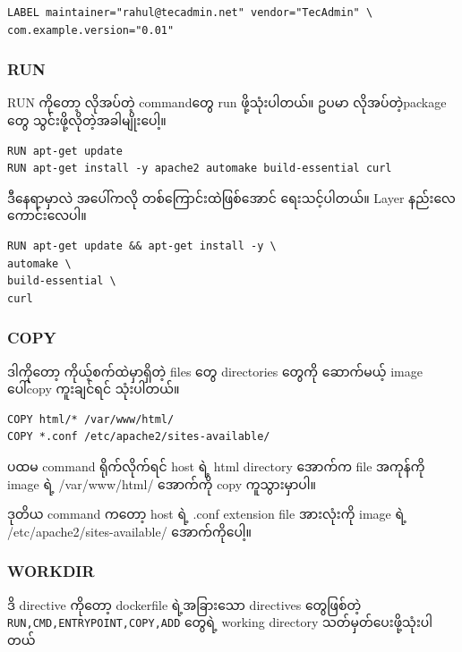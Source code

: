 \documentclass{article}
\begin{document}
\begin{verbatim}
LABEL maintainer="rahul@tecadmin.net" vendor="TecAdmin" \
com.example.version="0.01"
\end{verbatim}

\subsubsection{RUN}\label{run}

RUN ကို​တော့ လိုအပ်​တဲ့ command​တွေ run ဖို့သုံးပါတယ်။ ဥပမာ
လိုအပ်တဲ့​package​တွေ သွင်းဖို့လိုတဲ့အခါမျိုး​ပေါ့။

\begin{verbatim}
RUN apt-get update 
RUN apt-get install -y apache2 automake build-essential curl ​​
\end{verbatim}

ဒီ​နေရာမှာလဲ အ​ပေါ်ကလို တစ်​​ကြောင်းထဲဖြစ်​​အောင်​ ​ရေးသင့်ပါတယ်​။ Layer
နည်း​လေ​ကောင်း​လေပါ။

\begin{verbatim}
RUN apt-get update && apt-get install -y \
automake \
build-essential \
curl
\end{verbatim}

\subsubsection{COPY}\label{copy}

ဒါကို​တော့ ကိုယ့်စက်​ထဲမှာရှိတဲ့ files ​တွေ directories ​တွေကို
​ဆောက်​မယ့် image ​ပေါ်copy ကူးချင်​ရင်​ သုံးပါတယ်။​

\begin{verbatim}
COPY html/* /var/www/html/
COPY *.conf /etc/apache2/sites-available/
\end{verbatim}

ပထမ command ရိုက်​လိုက်​ရင်​ host ရဲ့ html directory ​အောက်​က file
အကုန်​ကို image ရဲ့ /var/www/html/ ​အောက်​ကို copy ကူသွားမှာပါ။

ဒုတိယ command က​တော့ host ရဲ့ .conf extension file အားလုံးကို image ရဲ့
/etc/apache2/sites-available/ ​အောက်​ကို​ပေါ့။

\subsubsection{WORKDIR}\label{workdir}

ဒိ directive ကို​တော့ dockerfile ရဲ့အခြား​သော directives ​တွေဖြစ်​တဲ့
\texttt{RUN,CMD,ENTRYPOINT,COPY,ADD} ​တွေရဲ့ working directory
သတ်​မှတ်​​ပေးဖို့သုံးပါတယ်​
\end{document}
